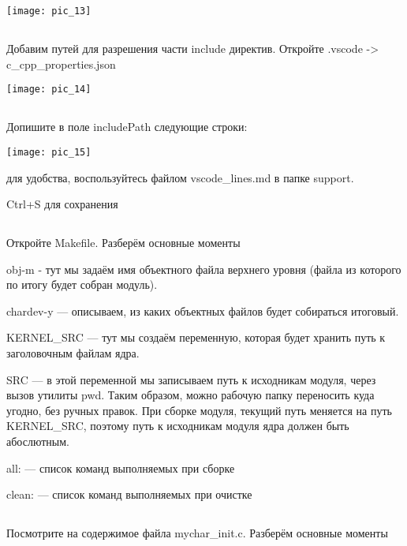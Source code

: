 \begin{center}
	\texttt{[image: pic\_13]}
\end{center}

\subsection{}Добавим путей для разрешения части include директив. Откройте .vscode -> c\_cpp\_properties.json
\begin{center}
	\texttt{[image: pic\_14]}
\end{center}

\subsection{}Допишите в поле includePath следующие строки:\\
\begin{center}
	\texttt{[image: pic\_15]}
\end{center}
для удобства, воспользуйтесь файлом vscode\_lines.md в папке support.

Ctrl+S для сохранения

\subsection{}Откройте Makefile. Разберём основные моменты

obj-m  - тут мы задаём имя объектного файла верхнего уровня (файла из которого по итогу будет собран модуль). 

chardev-y — описываем, из каких объектных файлов будет собираться итоговый. 

KERNEL\_SRC — тут мы создаём переменную, которая будет хранить путь к заголовочным файлам ядра.

SRC — в этой переменной мы записываем путь к исходникам модуля, через вызов утилиты pwd. Таким образом, можно рабочую папку переносить куда угодно, без ручных правок. При сборке модуля, текущий путь меняется на путь KERNEL\_SRC, поэтому путь к исходникам модуля ядра должен быть абослютным.

all: — список команд выполняемых при сборке 

clean: — список команд выполняемых при очистке

\subsection{}Посмотрите на содержимое файла mychar\_init.c. Разберём основные моменты

